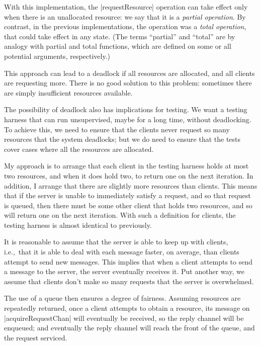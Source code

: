 With this implementation, the |requestResource| operation can take effect only
when there is an unallocated resource: we say that it is a \emph{partial
  operation}.  By contrast, in the previous implementations, the operation was
a \emph{total operation}, that could take effect in any state.  (The terms
``partial'' and ``total'' are by analogy with partial and total functions,
which are defined on some or all potential arguments, respectively.)

This approach can lead to a deadlock if all resources are allocated, and all
clients are requesting more.  There is no good solution to this problem:
sometimes there are simply insufficient resources available.  

The possibility of deadlock also has implications for testing.  We want a
testing harness that can run unsupervised, maybe for a long time, without
deadlocking.  To achieve this, we need to ensure that the clients never
request so many resources that the system deadlocks; but we do need to ensure
that the tests cover cases where all the resources are allocated.

My approach is to arrange that each client in the testing harness holds at
most two resources, and when it does hold two, to return one on the next
iteration.  In addition, I arrange that there are slightly more resources than
clients.  This means that if the server is unable to immediately satisfy a
request, and so that request is queued, then there must be some other client
that holds two resources, and so will return one on the next iteration.  With
such a definition for clients, the testing harness is almost identical to
previously. 

It is reasonable to assume that the server is able to keep up with clients,
i.e.,~that it is able to deal with each message faster, on average, than
clients attempt to send new messages.  This implies that when a client
attempts to send a message to the server, the server eventually receives it.
Put another way, we assume that clients don't make so many requests that the
server is overwhelmed.

The use of a queue then ensures a degree of fairness.  Assuming resources are
repeatedly returned, once a client attempts to obtain a resource, its message
on |acquireRequestChan| will eventually be received, so the reply channel will
be enqueued; and eventually the reply channel will reach the front of the
queue, and the request serviced.



